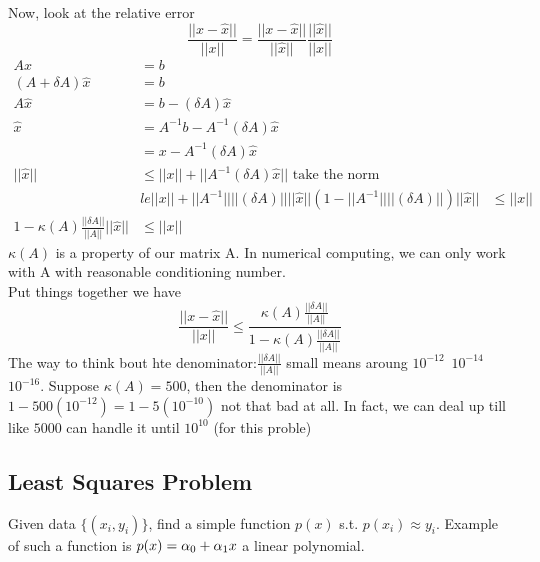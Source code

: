 Now, look at the relative error $$\frac{||x-\hat
  x||}{||x||}=\frac{||x-\hat x||}{||\hat x||}\frac{||\hat
  x||}{||x||}$$
\begin{align*}
Ax&=b \\
(A+\delta A)\hat x &= b\\
A\hat x&= b-(\delta A)\hat x\\
\hat x &= A^{-1}b - A^{-1}(\delta A)\hat x\\
&= x -  A^{-1}(\delta A)\hat x\\
||\hat x|| &\le ||x|| + ||A^{-1}(\delta A)\hat x|| \text{ take the
  norm}\\ 
&le  ||x|| + ||A^{-1}|| ||(\delta A)||||\hat x|| 
(1-||A^{-1}||||(\delta A)|| )||\hat x|| &\le ||x||\\
1-\kappa(A)\frac{||\delta A||}{||A||}||\hat x|| &\le ||x||
\end{align*}
$\kappa(A)$ is a property of our matrix A. In numerical computing, we
can only work with A with reasonable conditioning number.\\
Put things together we have
$$\frac{||x-\hat
  x||}{||x||} \le \frac{ \kappa(A)\frac{||\delta A||}{||A||}}{1-\kappa(A)\frac{||\delta A||}{||A||}}$$
The way to think bout hte denominator:$\frac{||\delta A||}{||A||}$
small means aroung $10^{-12}$~$10^{-14}$~$10^{-16}$. Suppose
$\kappa(A)=500$, then the denominator is
$1-500(10^{-12})=1-5(10^{-10})$ not that bad at all. In fact, we can
deal up till like $5000$ can handle it until $10^{10}$ (for this
proble)

\subsection{Least Squares Problem}
\label{sec:leastsquares}

Given data $\{(x_i,y_i)\}$, find a simple function $p(x)$
s.t. $p(x_i)\approx y_i$. Example of such a function is
$p(x)=\alpha_0+\alpha_1x$ a linear polynomial. 

